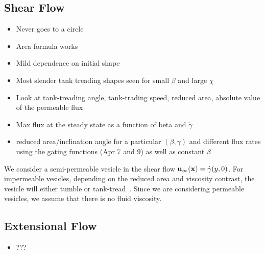 \documentclass[aps,prl,showpacs]{revtex4}
\newif\ifTikz
\begin{document}
%  



\subsection{Shear Flow}
\begin{itemize}
  \item Never goes to a circle
  \item Area formula works
  \item Mild dependence on initial shape
  \item Most slender tank treading shapes seen for small $\beta$ and
    large $\chi$

  \item Look at tank-treading angle, tank-trading speed, reduced area,
    absolute value of the permeable flux
  \item Max flux at the steady state as a function of beta and
    $\dot{\gamma}$

  \item reduced area/inclination angle for a particular $(\beta,\gamma)$
    and different flux rates using the gating functions (Apr 7 and 9) as
    well as constant $\beta$
\end{itemize}

We consider a semi-permeable vesicle in the shear flow
$\mathbf{u}_{\infty}(\mathbf{x}) = \dot{\gamma} (y,0)$. For impermeable vesicles,
depending on the reduced area and viscosity contrast, the vesicle will
either tumble or tank-tread~\cite{fin-lam-sei-gom2008}. Since we are
considering permeable vesicles, we assume that there is no fluid
viscosity. 


\ifTikz
 
\fi

\subsection{Extensional Flow}
\begin{itemize}
  \item ???
\end{itemize}
\end{document}
